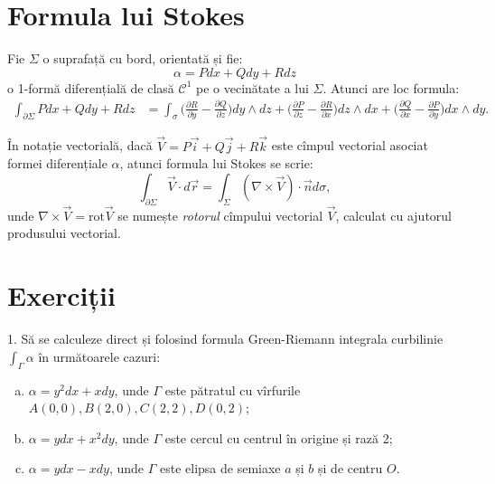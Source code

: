 \documentclass[12pt,a4paper]{article}
\newcommand\kal{\mathcal}
\theoremstyle{dotless}
\theoremstyle{dotlessdr}
\begin{document}
\section{Formula lui Stokes}
\label{sec:stokes}

Fie $\Sigma$ o suprafață cu bord, orientată și fie:
\[
  \alpha = Pdx + Qdy + Rdz
\]
o 1-formă diferențială de clasă $\kal{C}^1$ pe o vecinătate a lui $\Sigma$.
Atunci are loc formula:
\begin{align*}
  \int_{\partial \Sigma} Pdx + Qdy + Rdz &= \int_\sigma \Big( \frac{\partial R}{\partial y} -
                                           \frac{\partial Q}{\partial z} \Big) dy \wedge dz +
                                           \Big( \frac{\partial P}{\partial z} -
                                           \frac{\partial R}{\partial x} \Big) dz \wedge dx +
                                           \Big( \frac{\partial Q}{\partial x} -
                                           \frac{\partial P}{\partial y}\Big) dx \wedge dy.
\end{align*}

În notație vectorială, dacă $\vec{V} = P \vec{i} + Q \vec{j} + R \vec{k}$ este cîmpul
vectorial asociat formei diferențiale $\alpha$, atunci formula lui Stokes se scrie:
\[
  \int_{\partial \Sigma} \vec{V} \cdot d\vec{r} = \int_\Sigma (\nabla \times \vec{V}) %
  \cdot \vec{n} d \sigma,
\]
unde $\nabla \times \vec{V} = \mathrm{rot}\vec{V}$ se numește \emph{rotorul} cîmpului
vectorial $\vec{V}$, calculat cu ajutorul produsului vectorial.


\section{Exerciții}
\label{sec:exc-f}

1. Să se calculeze direct și folosind formula Green-Riemann integrala curbilinie
$\int_\Gamma \alpha$ în următoarele cazuri:
\begin{enumerate}[(a)]
\item $\alpha = y^2 dx + xdy$, unde $\Gamma$ este pătratul cu vîrfurile
  $A(0, 0), B(2, 0), C(2,2), D(0, 2)$;
\item $\alpha = ydx + x^2 dy$, unde $\Gamma$ este cercul cu centrul în origine și
  rază 2;
\item $\alpha = ydx - xdy$, unde $\Gamma$ este elipsa de semiaxe $a$ și $b$ și de
  centru $O$.
\end{enumerate}
\end{document}
